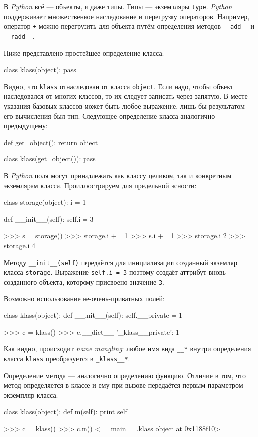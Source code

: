 В \emph{Python} всё — объекты, и даже типы. Типы — экземпляры \lstinline{type}. \emph{Python} поддерживает множественное наследование и перегрузку операторов. Например, оператор \lstinline{+} можно перегрузить для объекта путём определения методов \lstinline{__add__} и \lstinline{__radd__}.

Ниже представлено простейшее определение класса:
\begin{pylst}{}{}
class klass(object):
    pass
\end{pylst}

Видно, что \lstinline{klass} отнаследован от класса \lstinline{object}. Если надо, чтобы объект наследовался от многих классов, то их следует записать через запятую. В месте указания базовых классов может быть любое выражение, лишь бы результатом его вычисления был тип. Следующее определение класса аналогично предыдущему:
\begin{pylst}{}{}
def get_object():
    return object

class klass(get_object()):
    pass
\end{pylst}

В \emph{Python} поля могут принадлежать как классу целиком, так и конкретным экземлярам класса. Проиллюстрируем для предельной ясности:
\begin{pylst}{}{}
class storage(object):
    i = 1

    def __init__(self):
        self.i = 3

>>> s = storage()
>>> storage.i += 1
>>> s.i += 1
>>> storage.i
2
>>> storage.i
4
\end{pylst}

Методу \lstinline{__init__(self)} передаётся для инициализации созданный экземляр класса \lstinline{storage}. Выражение \lstinline{self.i = 3} поэтому создаёт аттрибут вновь созданного объекта, которому присвоено значение \lstinline{3}.

Возможно использование не-очень-приватных полей:
\begin{pylst}{}{}
class klass(object):
    def __init__(self):
        self.__private = 1

>>> c = klass()
>>> c.__dict__
{'_klass__private': 1}
\end{pylst}

Как видно, происходит \emph{name mangling}: любое имя вида \lstinline{__*} внутри определения класса \lstinline{klass} преобразуется в \lstinline{_klass__*}.

Определение метода — аналогично определению функцию. Отличие в том, что метод определяется в классе и ему при вызове передаётся первым параметром экземпляр класса.
\begin{pylst}{}{}
class klass(object):
    def m(self):
        print self

>>> c = klass()
>>> c.m()
<__main__.klass object at 0x1188f10>
\end{pylst}

